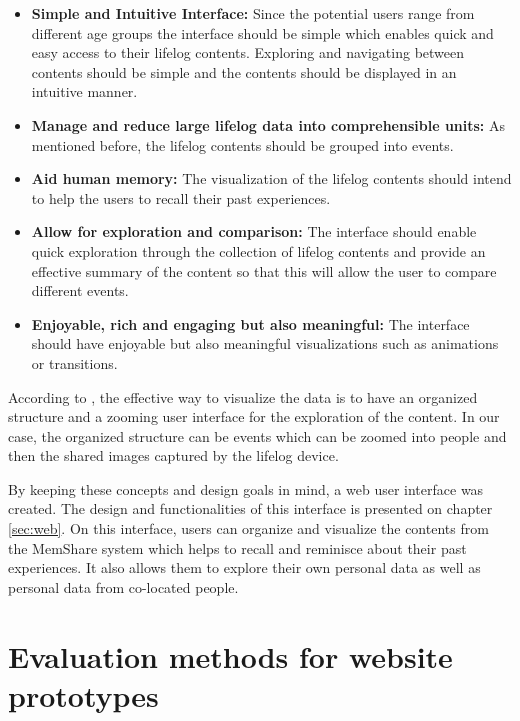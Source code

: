 \documentclass[mscthesis]{usiinfthesis}
\begin{document}
\begin{itemize}
\item \textbf{Simple and Intuitive Interface:} Since the potential users range from different age groups the interface should be simple which enables quick and easy access to their lifelog contents. Exploring and navigating between contents should be simple and the contents should be displayed in an intuitive manner. 
\item \textbf{Manage and reduce large lifelog data into comprehensible units:} As mentioned before, the lifelog contents should be grouped into events.
\item \textbf{Aid human memory:} The visualization of the lifelog contents should intend to help the users to recall their past experiences.
\item \textbf{Allow for exploration and comparison:} The interface should enable quick exploration through the collection of lifelog contents and provide an effective summary of the content so that this will allow the user to compare different events.
\item \textbf{Enjoyable, rich and engaging but also meaningful:} The interface should have enjoyable but also meaningful visualizations such as animations or transitions.  
\end{itemize}

According to \citeauthor{teraoka_organization_2012}, the effective way to visualize the data is to have an organized structure and a zooming user interface for the exploration of the content. In our case, the organized structure can be events which can be zoomed into people and then the shared images captured by the lifelog device. 
\newline

By keeping these concepts and design goals in mind, a web user interface was created. The design and functionalities of this interface is presented on chapter \ref{sec:web}. On this interface, users can organize and visualize the contents from the MemShare system which helps to recall and reminisce about their past experiences. It also allows them to explore their own personal data as well as personal data from co-located people.

\section{Evaluation methods for website prototypes}
\end{document}
